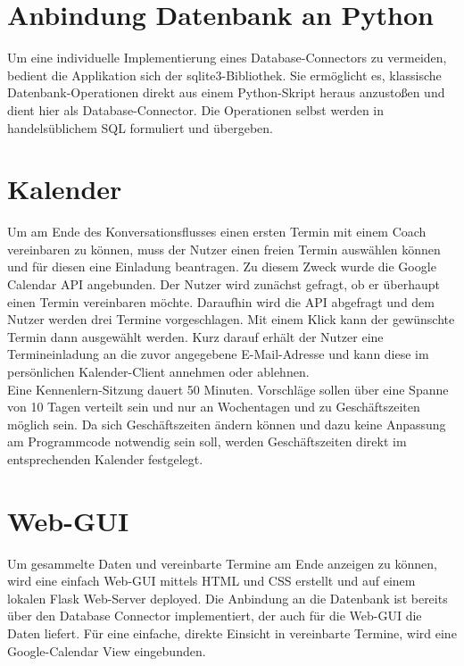     \section{Anbindung Datenbank an Python}
        Um eine individuelle Implementierung eines Database-Connectors zu vermeiden, bedient die Applikation sich der sqlite3-Bibliothek. Sie ermöglicht es, klassische Datenbank-Operationen direkt aus einem Python-Skript heraus anzustoßen und dient hier als Database-Connector. Die Operationen selbst werden in handelsüblichem SQL formuliert und übergeben.


    \section{Kalender}
        Um am Ende des Konversationsflusses einen ersten Termin mit einem Coach vereinbaren zu können, muss der Nutzer einen freien Termin auswählen können und für diesen eine Einladung beantragen. Zu diesem Zweck wurde die Google Calendar API angebunden. Der Nutzer wird zunächst gefragt, ob er überhaupt einen Termin vereinbaren möchte. Daraufhin wird die API abgefragt und dem Nutzer werden drei Termine vorgeschlagen. Mit einem Klick kann der gewünschte Termin dann ausgewählt werden. Kurz darauf erhält der Nutzer eine Termineinladung an die zuvor angegebene E-Mail-Adresse und kann diese im persönlichen Kalender-Client annehmen oder ablehnen. \\
        Eine Kennenlern-Sitzung dauert 50 Minuten. Vorschläge sollen über eine Spanne von 10 Tagen verteilt sein und nur an Wochentagen und zu Geschäftszeiten möglich sein. Da sich Geschäftszeiten ändern können und dazu keine Anpassung am Programmcode notwendig sein soll, werden Geschäftszeiten direkt im entsprechenden Kalender festgelegt.

    
    \section{Web-GUI}
        Um gesammelte Daten und vereinbarte Termine am Ende anzeigen zu können, wird eine einfach Web-GUI mittels HTML und CSS erstellt und auf einem lokalen Flask Web-Server deployed. Die Anbindung an die Datenbank ist bereits über den Database Connector implementiert, der auch für die Web-GUI die Daten liefert. Für eine einfache, direkte Einsicht in vereinbarte Termine, wird eine Google-Calendar View eingebunden. 